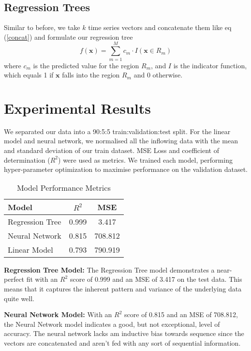 \documentclass[12pt,a4paper]{article}
\begin{document}
\subsection{Regression Trees}
Similar to before, we take $k$ time series vectors and concatenate them like eq (\ref{concat}) and formulate our regression tree
\begin{equation}
f(\mathbf{x}) = \sum_{m=1}^{M} c_m \cdot I(\mathbf{x} \in R_m)
\end{equation}
where \( c_m \) is the predicted value for the region \( R_m \), and \( I \) is the indicator function, which equals 1 if \( \mathbf{x} \) falls into the region \( R_m \) and 0 otherwise.

\section{Experimental Results}
We separated our data into a 90:5:5 train:validation:test split. For the linear model and neural network, we normalised all the inflowing data with the mean and standard deviation of our train dataset. MSE Loss and coefficient of determination ($R^2$) were used as metrics. We trained each model, performing hyper-parameter optimization to maximise performance on the validation dataset.

\begin{table}[ht]
\centering
\begin{tabular}{@{}lcc@{}}
\toprule
Model             & \( R^2 \) & MSE      \\ \midrule
Regression Tree   & 0.999     & 3.417    \\
Neural Network    & 0.815     & 708.812  \\
Linear Model      & 0.793     & 790.919  \\ \bottomrule
\end{tabular}
\caption{Model Performance Metrics}
\label{tab:model_metrics}
\end{table}

\textbf{Regression Tree Model:}
The Regression Tree model demonstrates a near-perfect fit with an \( R^2 \) score of 0.999 and an MSE of 3.417 on the test data. This means that it captures the inherent pattern and variance of the underlying data quite well.

\textbf{Neural Network Model:}
With an \( R^2 \) score of 0.815 and an MSE of 708.812, the Neural Network model indicates a good, but not exceptional, level of accuracy. The neural network lacks am inductive bias towards sequence since the vectors are concatenated and aren't fed with any sort of sequential information.
\end{document}

